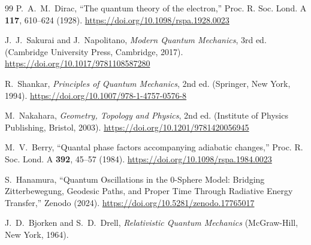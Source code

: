 \documentclass[%
 reprint,
 amsmath,amssymb,
 aps,
 prb,
]{revtex4-2}
\numberwithin{equation}{section}
\begin{document}
\begin{thebibliography}{99}
P.~A.~M.~Dirac,
``The quantum theory of the electron,''
Proc. R. Soc. Lond. A \textbf{117}, 610--624 (1928).
\href{https://doi.org/10.1098/rspa.1928.0023}{https://doi.org/10.1098/rspa.1928.0023}

J.~J.~Sakurai and J.~Napolitano,
\textit{Modern Quantum Mechanics}, 3rd ed.
(Cambridge University Press, Cambridge, 2017).
\href{https://doi.org/10.1017/9781108587280}{https://doi.org/10.1017/9781108587280}

R.~Shankar,
\textit{Principles of Quantum Mechanics}, 2nd ed.
(Springer, New York, 1994).
\href{https://doi.org/10.1007/978-1-4757-0576-8}{https://doi.org/10.1007/978-1-4757-0576-8}

M.~Nakahara,
\textit{Geometry, Topology and Physics}, 2nd ed.
(Institute of Physics Publishing, Bristol, 2003).
\href{https://doi.org/10.1201/9781420056945}{https://doi.org/10.1201/9781420056945}

M.~V.~Berry,
``Quantal phase factors accompanying adiabatic changes,''
Proc. R. Soc. Lond. A \textbf{392}, 45--57 (1984).
\href{https://doi.org/10.1098/rspa.1984.0023}{https://doi.org/10.1098/rspa.1984.0023}

S.~Hanamura,
``Quantum Oscillations in the 0-Sphere Model: Bridging Zitterbewegung, Geodesic Paths, and Proper Time Through Radiative Energy Transfer,''
Zenodo (2024).
\href{https://doi.org/10.5281/zenodo.17765017}{https://doi.org/10.5281/zenodo.17765017}

J.~D.~Bjorken and S.~D.~Drell,
\textit{Relativistic Quantum Mechanics}
(McGraw-Hill, New York, 1964).


\end{thebibliography}
\end{document}
